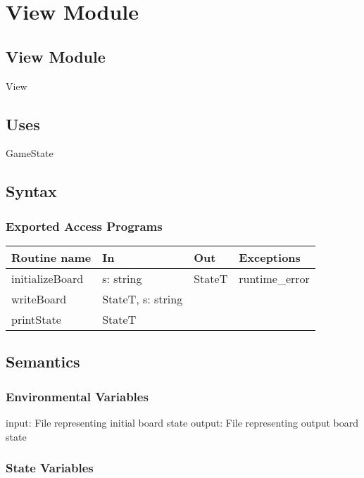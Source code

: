 \documentclass[12pt]{article}
\begin{document}
\newpage

\section* {View Module}

\subsection* {View Module}

View

\subsection* {Uses}

GameState

\subsection* {Syntax}


\subsubsection* {Exported Access Programs}

\begin{tabular}{| l | l | l | p{5cm} |}
\hline
\textbf{Routine name} & \textbf{In} & \textbf{Out} & \textbf{Exceptions}\\
\hline
initializeBoard & s: string & StateT & runtime\_error\\
\hline
writeBoard & StateT, s: string &  & \\
\hline
printState& StateT & &  \\
\hline
\end{tabular}

\subsection* {Semantics}

\subsubsection* {Environmental Variables}
input: File representing initial board state
output: File representing output board state

\subsubsection* {State Variables}
\end{document}
